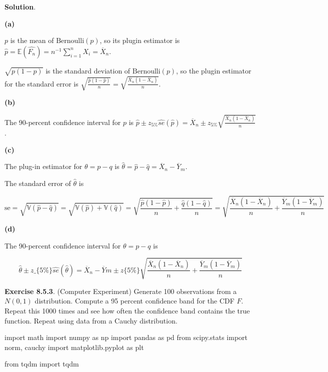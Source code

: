\textbf{Solution}.

\textbf{(a)}

\(p\) is the mean of \(\text{Bernoulli}(p)\), so its plugin estimator is
\(\hat{p} = \mathbb{E}(\hat{F_{n}}) = n^{-1} \sum_{i=1}^{n} X_{i}  = \overline{X}_{n}\).

\(\sqrt{p(1-p)}\) is the standard deviation of \(\text{Bernoulli}(p)\),
so the plugin estimator for the standard error is
\(\sqrt{\frac{\hat{p}(1-\hat{p})}{n}} = \sqrt{\frac{\overline{X}_{n}(1 - \overline{X}_{n})}{n}}\).

\textbf{(b)}

The 90-percent confidence interval for \(p\) is
\(\hat{p} \pm z_{5\%} \hat{se}(\hat{p})= \overline{X}_{n} \pm z_{5\%} \sqrt{\frac{\overline{X}_{n}(1-\overline{X}_{n})}{n}}\).

\textbf{(c)}

The plug-in estimator for \(\theta = p - q\) is
\(\hat{\theta} = \hat{p} - \hat{q} = \overline{X}_{n} - \overline{Y}_m\).

The standard error of \(\hat{\theta}\) is

\[
\text{se} = \sqrt{\mathbb{V}(\hat{p} - \hat{q})} = \sqrt{\mathbb{V}(\hat{p}) + \mathbb{V}(\hat{q})} = \sqrt{\frac{\hat{p}(1 - \hat{p})}{n} + \frac{\hat{q}(1 - \hat{q})}{n}} = \sqrt{\frac{\overline{X}_{n}(1 - \overline{X}_{n})}{n} + \frac{\overline{Y}_m(1 - \overline{Y}_m)}{n}} 
\]

\textbf{(d)}

The 90-percent confidence interval for \(\theta = p - q\) is

\[
\hat{\theta} \pm z\_\{5\%\} \hat{se}(\hat{\theta}) 
= \overline{X}_{n} -
\overline{Y}m \pm z \{5\%\}
\sqrt{\frac{\overline{X}_{n}(1 - \overline{X}_{n})}{n} + \frac{\overline{Y}_m(1 - \overline{Y}_m)}{n}}
\]

\textbf{Exercise 8.5.3}. (Computer Experiment) Generate 100 observations
from a \(N(0, 1)\) distribution. Compute a 95 percent confidence band
for the CDF \(F\). Repeat this 1000 times and see how often the
confidence band contains the true function. Repeat using data from a
Cauchy distribution.

\begin{python}
import math
import numpy as np
import pandas as pd
from scipy.stats import norm, cauchy
import matplotlib.pyplot as plt

from tqdm import tqdm
\end{python}

